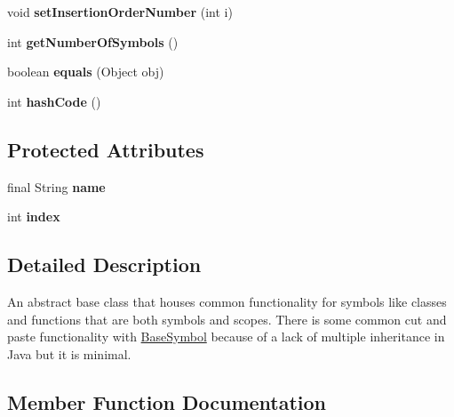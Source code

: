 \begin{DoxyCompactItemize}
void {\bfseries set\+Insertion\+Order\+Number} (int i)
\item 
\mbox{\label{classlime_1_1antlr4_1_1SymbolWithScope_a77acad3e533c8063901d87487c29e575}} 
int {\bfseries get\+Number\+Of\+Symbols} ()
\item 
\mbox{\label{classlime_1_1antlr4_1_1SymbolWithScope_ac402f7bf3f5a73b5b033619992a68538}} 
boolean {\bfseries equals} (Object obj)
\item 
\mbox{\label{classlime_1_1antlr4_1_1SymbolWithScope_afa77249db70622d9e8592e89e102d8a3}} 
int {\bfseries hash\+Code} ()
\end{DoxyCompactItemize}
\subsection*{Protected Attributes}
\begin{DoxyCompactItemize}
\item 
\mbox{\label{classlime_1_1antlr4_1_1SymbolWithScope_a7537cbea897a3f369f0d9074418adb67}} 
final String {\bfseries name}
\item 
\mbox{\label{classlime_1_1antlr4_1_1SymbolWithScope_abff222d2d1e2f0329d6c53b8670677ff}} 
int {\bfseries index}
\end{DoxyCompactItemize}


\subsection{Detailed Description}
An abstract base class that houses common functionality for symbols like classes and functions that are both symbols and scopes. There is some common cut and paste functionality with \hyperlink{classlime_1_1antlr4_1_1BaseSymbol}{Base\+Symbol} because of a lack of multiple inheritance in Java but it is minimal. 

\subsection{Member Function Documentation}
\mbox{\label{classlime_1_1antlr4_1_1SymbolWithScope_a68929d57f3b42ada5948bec1e5fef6e3}} 
